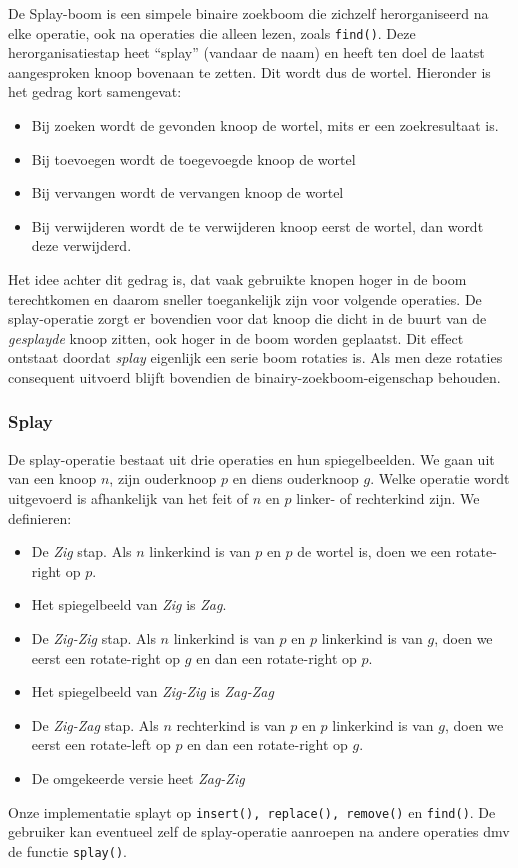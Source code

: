 \documentclass[a4paper,10pt]{article}
\begin{document}
De Splay-boom is een simpele binaire zoekboom die zichzelf herorganiseerd na elke operatie, ook na operaties die alleen lezen, zoals \texttt{find()}. Deze herorganisatiestap heet ``splay'' (vandaar de naam) en heeft ten doel de laatst aangesproken knoop bovenaan te zetten. Dit wordt dus de wortel. Hieronder is het gedrag kort samengevat:
\begin{itemize}
\item Bij zoeken wordt de gevonden knoop de wortel, mits er een zoekresultaat is.
\item Bij toevoegen wordt de toegevoegde knoop de wortel
\item Bij vervangen wordt de vervangen knoop de wortel
\item Bij verwijderen wordt de te verwijderen knoop eerst de wortel, dan wordt deze verwijderd.
\end{itemize}
Het idee achter dit gedrag is, dat vaak gebruikte knopen hoger in de boom terechtkomen en daarom sneller toegankelijk zijn voor volgende operaties. De splay-operatie zorgt er bovendien voor dat knoop die dicht in de buurt van de \emph{gesplayde} knoop zitten, ook hoger in
de boom worden geplaatst. Dit effect ontstaat doordat \emph{splay} eigenlijk een serie boom rotaties is. Als men deze rotaties
consequent uitvoerd blijft bovendien de binairy-zoekboom-eigenschap behouden.

\subsubsection{Splay}

De splay-operatie bestaat uit drie operaties en hun spiegelbeelden. We gaan uit van een knoop $n$, zijn ouderknoop $p$ en diens ouderknoop $g$. Welke operatie wordt uitgevoerd is afhankelijk van het feit of $n$ en $p$ linker- of rechterkind zijn. We definieren:
\begin{itemize}
\item De \emph{Zig} stap. Als $n$ linkerkind is van $p$ en $p$ de wortel is, doen we een rotate-right op $p$.
\item Het spiegelbeeld van \emph{Zig} is \emph{Zag}.
\item De \emph{Zig-Zig} stap. Als $n$ linkerkind is van $p$ en $p$ linkerkind is van $g$, doen we eerst een rotate-right op $g$ en dan een rotate-right op $p$.
\item Het spiegelbeeld van \emph{Zig-Zig} is \emph{Zag-Zag}
\item De \emph{Zig-Zag} stap. Als $n$ rechterkind is van $p$ en $p$ linkerkind is van $g$, doen we eerst een rotate-left op $p$ en dan een rotate-right op $g$.
\item De omgekeerde versie heet \emph{Zag-Zig}
\end{itemize}
Onze implementatie splayt op \texttt{insert(), replace(), remove()} en \texttt{find()}. De gebruiker kan eventueel zelf de splay-operatie aanroepen na andere operaties dmv de functie \texttt{splay()}.
\end{document}

